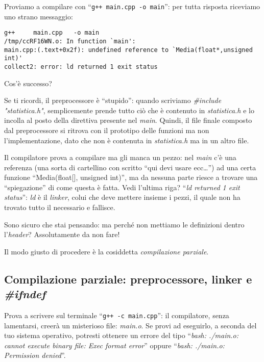 Proviamo a compilare con ``\verb|g++ main.cpp -o main|'': per tutta risposta riceviamo uno strano messaggio:
\begin{shaded}
\begin{verbatim}
g++     main.cpp   -o main
/tmp/ccRF16WN.o: In function `main':
main.cpp:(.text+0x2f): undefined reference to `Media(float*,unsigned int)'
collect2: error: ld returned 1 exit status
\end{verbatim}
\end{shaded}
Cos'è successo?

Se ti ricordi, il preprocessore è ``stupido'': quando scriviamo \emph{\#include "statistica.h"}, semplicemente prende tutto ciò che è contenuto in \emph{statistica.h} e lo incolla al posto della direttiva presente nel \emph{main}. Quindi, il file finale composto dal preprocessore si ritrova con il prototipo delle funzioni ma non l'implementazione, dato che non è contenuta in \emph{statistica.h} ma in un altro file. 

Il compilatore prova a compilare ma gli manca un pezzo: nel \emph{main} c'è una referenza (una sorta di cartellino con scritto ``qui devi usare ecc\ldots'') ad una certa funzione ``Media(float[], unsigned int)'', ma da nessuna parte riesce a trovare una ``spiegazione'' di come questa è fatta. Vedi l'ultima riga? ``\emph{ld returned 1 exit status}'': \emph{ld} è il \emph{linker}, colui che deve mettere insieme i pezzi, il quale non ha trovato tutto il necessario e fallisce.

Sono sicuro che stai pensando: ma perché non mettiamo le definizioni dentro l'\emph{header}? Assolutamente da non fare!

Il modo giusto di procedere è la cosiddetta \emph{compilazione parziale}.

\subsection{Compilazione parziale: preprocessore, linker e \emph{\#ifndef}}
Prova a scrivere sul terminale ``\verb|g++ -c main.cpp|'': il compilatore, senza lamentarsi, creerà un misterioso file: \emph{main.o}. Se provi ad eseguirlo, a seconda del tuo sistema operativo, potresti ottenere un errore del tipo ``\emph{bash: ./main.o: cannot execute binary file: Exec format error}'' oppure ``\emph{bash: ./main.o: Permission denied}''. 

